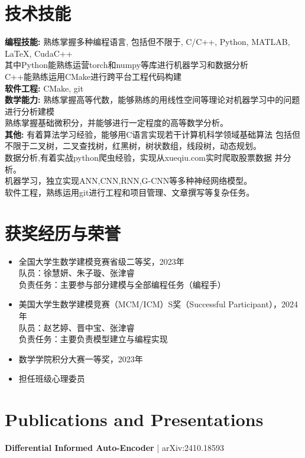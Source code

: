 \documentclass[a4paper,10pt]{article}
\begin{document}
\section*{技术技能}
\textbf{编程技能:} 熟练掌握多种编程语言, 包括但不限于, C/C++, Python, MATLAB, LaTeX, CudaC++  \\
其中Python能熟练运营torch和numpy等库进行机器学习和数据分析 \\
C++能熟练运用CMake进行跨平台工程代码构建 \\
\textbf{软件工程:} CMake, git \\
\textbf{数学能力:} 熟练掌握高等代数，能够熟练的用线性空间等理论对机器学习中的问题进行分析建模 \\
熟练掌握基础微积分，并能够进行一定程度的高等数学分析。\\
\textbf{其他:} 有着算法学习经验，能够用C语言实现若干计算机科学领域基础算法
包括但不限于二叉树，二叉查找树，红黑树，树状数组，线段树，动态规划。\\
数据分析,有着实战python爬虫经验，实现从xueqiu.com实时爬取股票数据
并分析。\\
机器学习，独立实现ANN,CNN,RNN,G-CNN等多种神经网络模型。\\
软件工程，熟练运用git进行工程和项目管理、文章撰写等复杂任务。

\section*{获奖经历与荣誉}
\begin{itemize}
    \item 全国大学生数学建模竞赛省级二等奖，2023年 \\
          队员：徐慧妍、朱子璇、张津睿 \\
          负责任务：主要参与部分建模与全部编程任务（编程手）
    \item 美国大学生数学建模竞赛（MCM/ICM）S奖（Successful Participant），2024年 \\
          队员：赵艺婷、晋中宝、张津睿 \\
          负责任务：主要负责模型建立与编程实现
    \item 数学学院积分大赛一等奖，2023年
    \item 担任班级心理委员
\end{itemize}

\section*{Publications and Presentations}
\textbf{Differential Informed Auto-Encoder} | arXiv:2410.18593  \\
\end{document}
